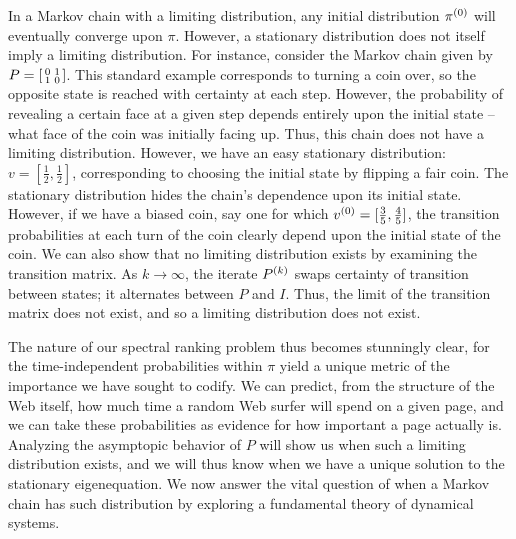 \documentclass[../exploring-pagerank.tex]{subfiles}
\begin{document}
	In a Markov chain with a limiting distribution, any initial distribution $\pi^{(0)}$ will eventually converge upon $\pi$. However, a stationary distribution does not itself imply a limiting distribution. For instance, consider the Markov chain given by $P=\begin{bsmallmatrix} 0 & 1 \\ 1 & 0 \end{bsmallmatrix}$. This standard example corresponds to turning a coin over, so the opposite state is reached with certainty at each step. However, the probability of revealing a certain face at a given step depends entirely upon the initial state -- what face of the coin was initially facing up. Thus, this chain does not have a limiting distribution. However, we have an easy stationary distribution: $v = [\frac{1}{2}, \frac{1}{2}]$, corresponding to choosing the initial state by flipping a fair coin. The stationary distribution hides the chain's dependence upon its initial state. However, if we have a biased coin, say one for which $v^{(0)} = [\frac{3}{5}, \frac{4}{5}]$, the transition probabilities at each turn of the coin clearly depend upon the initial state of the coin. We can also show that no limiting distribution exists by examining the transition matrix. As $k\to\infty$, the iterate $P^{(k)}$ swaps certainty of transition between states; it alternates between $P$ and $I$. Thus, the limit of the transition matrix does not exist, and so a limiting distribution does not exist.

    The nature of our spectral ranking problem thus becomes stunningly clear, for the time-independent probabilities within $\pi$ yield a unique metric of the importance we have sought to codify. We can predict, from the structure of the Web itself, how much time a random Web surfer will spend on a given page, and we can take these probabilities as evidence for how important a page actually is. Analyzing the asymptopic behavior of $P$ will show us when such a limiting distribution exists, and we will thus know when we have a unique solution to the stationary eigenequation. We now answer the vital question of when a Markov chain has such distribution by exploring a fundamental theory of dynamical systems.
\end{document}
